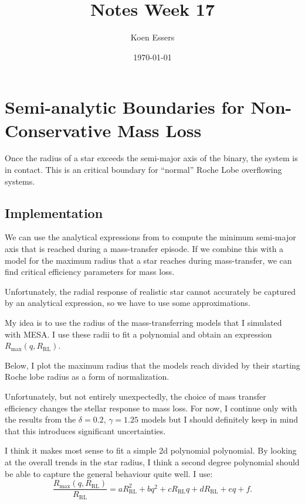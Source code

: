 \documentclass[a4paper,10pt]{article}
\title{Notes Week 17}
\author{Koen Essers}
\date{\today}
\begin{document}
\setuplayout
\section{Semi-analytic Boundaries for Non-Conservative Mass Loss}
Once the radius of a star exceeds the semi-major axis of the binary, the system is in contact. This is an critical boundary for ``normal'' Roche Lobe overflowing systems.

\subsection{Implementation}
We can use the analytical expressions from \citet{soberman1997} to compute the minimum semi-major axis that is reached during a mass-transfer episode. If we combine this with a model for the maximum radius that a star reaches during mass-transfer, we can find critical efficiency parameters for mass loss.

Unfortunately, the radial response of realistic star cannot accurately be captured by an analytical expression, so we have to use some approximations.

My idea is to use the radius of the mass-transferring models that I simulated with MESA. I use these radii to fit a polynomial and obtain an expression \(R_\text{max}(q, R_\text{RL})\).

Below, I plot the maximum radius that the models reach divided by their starting Roche lobe radius as a form of normalization. 
\begin{figure}[ht]
    \centering
\end{figure}

Unfortunately, but not entirely unexpectedly, the choice of mass transfer efficiency changes the stellar response to mass loss. For now, I continue only with the results from the \(\delta =0.2\), \(\gamma = 1.25\) models but I should definitely keep in mind that this introduces significant uncertainties.

I think it makes most sense to fit a simple 2d polynomial polynomial. By looking at the overall trends in the star radius, I think a second degree polynomial should be able to capture the general behaviour quite well. I use:
\begin{equation*}
    \frac{R_\text{max}(q, R_\text{RL})}{R_\text{RL}} = a R_\text{RL}^{2} + b q^{2} + c R_\text{RL}q + d R_\text{RL} + e q + f .
\end{equation*}
\end{document}
